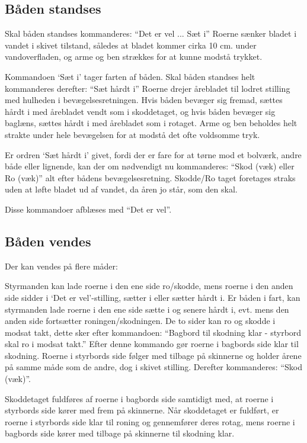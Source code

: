\documentclass{article}
\begin{document}
\subsection{Båden standses}

Skal båden standses kommanderes: ``Det er vel ... Sæt i'' Roerne sænker
bladet i vandet i skivet tilstand, således at bladet kommer cirka 10 cm.
under vandoverfladen, og arme og ben strækkes for at kunne modstå
trykket.

Kommandoen `Sæt i' tager farten af båden. Skal båden standses helt
kommanderes derefter: ``Sæt hårdt i'' Roerne drejer årebladet til lodret
stilling med hulheden i bevægelsesretningen. Hvis båden bevæger sig
fremad, sættes hårdt i med årebladet vendt som i skoddetaget, og hvis
båden bevæger sig baglæns, sættes hårdt i med årebladet som i rotaget.
Arme og ben beholdes helt strakte under hele bevægelsen for at modstå det
ofte voldsomme tryk.

Er ordren `Sæt hårdt i' givet, fordi der er fare for at tørne mod et
bolværk, andre både eller lignende, kan der om nødvendigt nu kommanderes:
``Skod (væk) eller Ro (væk)'' alt efter bådens bevægelsesretning.
Skodde/Ro taget foretages straks uden at løfte bladet ud af vandet, da
åren jo står, som den skal.

Disse kommandoer afblæses med ``Det er vel''.

\subsection{Båden vendes}

Der kan vendes på flere måder:

Styrmanden kan lade roerne i den ene side ro/skodde, mens roerne i den
anden side sidder i `Det er vel'-stilling, sætter i eller sætter hårdt i.
Er båden i fart, kan styrmanden lade roerne i den ene side sætte i og
senere hårdt i, evt. mens den anden side fortsætter roningen/skodningen.
De to sider kan ro og skodde i modsat takt, dette sker efter kommandoen:
``Bagbord til skodning klar - styrbord skal ro i modsat takt.'' Efter
denne kommando gør roerne i bagbords side klar til skodning. Roerne i
styrbords side følger med tilbage på skinnerne og holder årene på samme
måde som de andre, dog i skivet stilling. Derefter kommanderes: ``Skod
(væk)''.

Skoddetaget fuldføres af roerne i bagbords side samtidigt med, at roerne
i styrbords side kører med frem på skinnerne. Når skoddetaget er
fuldført, er roerne i styrbords side klar til roning og gennemfører deres
rotag, mens roerne i bagbords side kører med tilbage på skinnerne til
skodning klar.
\end{document}
